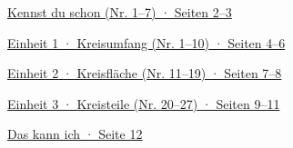 \documentclass[11pt]{article}
\newcommand{\vzeile}[2]{\par\noindent\hyperlink{#1}{#2}\par\medskip}
\begin{document}
\weit
{}
\vzeile{zone}{Kennst du schon (Nr. 1–7) · Seiten 2–3}
\vzeile{e1}{Einheit 1 · Kreisumfang (Nr. 1–10) · Seiten 4–6}
\vzeile{e2}{Einheit 2 · Kreisfläche (Nr. 11–19) · Seiten 7–8}
\vzeile{e3}{Einheit 3 · Kreisteile (Nr. 20–27) · Seiten 9–11}
\vzeile{abhaken}{Das kann ich · Seite 12}
\clearpage

\clearpage

\clearpage

\clearpage

\clearpage

\end{document}
